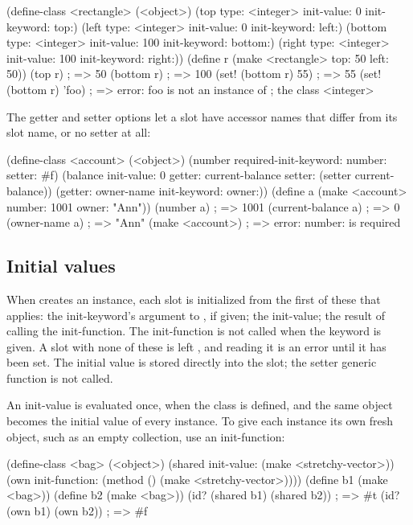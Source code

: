 \begin{dylan}
(define-class <rectangle> (<object>)
  (top type: <integer> init-value: 0 init-keyword: top:)
  (left type: <integer> init-value: 0 init-keyword: left:)
  (bottom type: <integer> init-value: 100 init-keyword: bottom:)
  (right type: <integer> init-value: 100 init-keyword: right:))
(define r (make <rectangle> top: 50 left: 50))
(top r)                        ; => 50
(bottom r)                     ; => 100
(set! (bottom r) 55)           ; => 55
(set! (bottom r) 'foo)         ; => error: foo is not an instance of
                               ;    {the class <integer>}
\end{dylan}

\noindent The getter and setter options let a slot have accessor names that
differ from its slot name, or no setter at all:

\begin{dylan}
(define-class <account> (<object>)
  (number required-init-keyword: number: setter: #f)
  (balance init-value: 0
           getter: current-balance setter: (setter current-balance))
  (getter: owner-name init-keyword: owner:))
(define a (make <account> number: 1001 owner: "Ann"))
(number a)                     ; => 1001
(current-balance a)            ; => 0
(owner-name a)                 ; => "Ann"
(make <account>)               ; => error: number: is required
\end{dylan}

\subsection{Initial values}\label{sec:classes-slot-init}

When  creates an instance, each slot is initialized from the
first of these that applies: the init-keyword's argument to , if
given; the init-value; the result of calling the init-function. The
init-function is not called when the keyword is given. A slot with none of
these is left , and reading it is an error until it has
been set. The initial value is stored directly into the slot; the setter
generic function is not called.

An init-value is evaluated once, when the class is defined, and the same
object becomes the initial value of every instance. To give each instance
its own fresh object, such as an empty collection, use an init-function:

\begin{dylan}
(define-class <bag> (<object>)
  (shared init-value: (make <stretchy-vector>))
  (own init-function: (method () (make <stretchy-vector>))))
(define b1 (make <bag>))
(define b2 (make <bag>))
(id? (shared b1) (shared b2))  ; => #t
(id? (own b1) (own b2))        ; => #f
\end{dylan}

